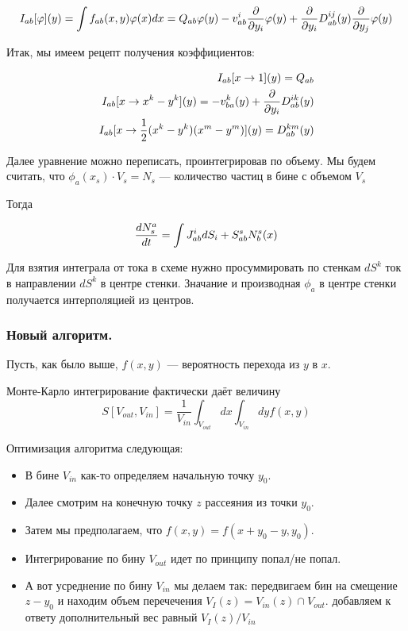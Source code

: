 \begin{equation*}
	I_{ab}[\varphi](y) = \int{f_{ab}(x,y)\varphi(x) dx} = Q_{ab}\varphi(y) - v^i_{ab}\frac{\partial }{\partial y_i}  \varphi(y) + \frac{\partial }{\partial y_i} D^{ij}_{ab}(y) \frac{\partial }{\partial y_j} \varphi(y)
\end{equation*}

Итак, мы имеем рецепт получения коэффициентов:

\begin{eqnarray*}
	I_{ab}[x \to 1](y)  = Q_{ab} \\
	I_{ab}[x \to x^k-y^k](y) = -v^k_{ba}(y) +  \frac{\partial }{\partial y_i} D^{ik}_{ab}(y) \\
	I_{ab}[x \to \frac{1}{2}(x^k-y^k)(x^m-y^m)](y) = D^{km}_{ab}(y)
\end{eqnarray*}

Далее уравнение можно переписать, проинтегрировав по объему. Мы будем считать, что $\phi_a(x_s)\cdot V_s = N_s$ --- количество частиц в бине с объемом $V_s$

Тогда

\begin{equation*}
	\frac{d N_{s}^a}{d t} = \int{J^i_{ab} dS_i} + S_{ab}^s N_b^s(x)
\end{equation*}

Для взятия интеграла от тока в схеме нужно просуммировать по стенкам $dS^k$ ток в направлении $dS^k$ в центре стенки. Значание и производная $\phi_a$ в центре стенки получается интерполяцией из центров.

\subsubsection{Новый алгоритм.}

Пусть, как было выше, $f(x,y)$ --- вероятность перехода из $y$ в $x$.

Монте-Карло интегрирование фактически даёт величину 
\begin{equation*}
	S[V_{out},V_{in}] = \frac{1}{V_{in}}\int_{V_{out}}{dx\int_{V_{in}}{dy f(x,y)}}
\end{equation*}

Оптимизация алгоритма следующая: 
\begin{itemize}
	\item В бине $V_{in}$ как-то определяем начальную точку $y_0$.
	\item Далее смотрим на конечную точку $z$ рассеяния из точки $y_0$.
	\item Затем мы предполагаем, что $f(x,y) = f(x + y_0 - y,y_0)$.
	\item Интегрирование по бину $V_{out}$ идет по принципу попал/не попал.
	\item А вот усреднение по бину $V_{in}$ мы делаем так: передвигаем бин на смещение $z-y_0$ и находим объем перечечения $V_I(z) = V_{in}(z) \cap V_{out}$. добавляем к ответу дополнительный вес равный $V_I(z)/V_{in}$
\end{itemize}

